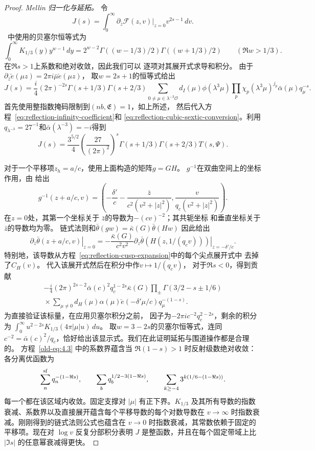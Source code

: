 \documentclass[11pt,a4paper]{article}
\numberwithin{equation}{section}
\numberwithin{figure}{section}
\theoremstyle{definition}
\theoremstyle{remark}
\begin{document}
\begin{proof}
\emph{Mellin 归一化与延拓。}
令
\[
 J(s)=\int_0^\infty
       \left.\partial_{\bar z}\mathcal F(z,v)\right|_{z=0}
       v^{2s-1}\,dv.
\]
~\cite[Lemma~5.3]{DR}中使用的贝塞尔恒等式为
\[
 \int_0^\infty K_{1/3}(y)y^{w-1}\,dy
  =2^{w-2}\Gamma((w-1/3)/2)\Gamma((w+1/3)/2)
       \qquad(\Re w>1/3).
\]
在$\Re s>1$上系数和绝对收敛，因此我们可以
逐项对其展开式求导和积分。
由于$\partial_{\bar z}\check e(\mu z)=2\pi i\bar\mu\check e(\mu z)$，
取$w=2s+1$的恒等式给出
\[
 J(s)=\frac i4(2\pi)^{-2s}\Gamma(s+1/3)\Gamma(s+2/3)
       \sum_{0\ne\mu\in\lambda^{-3}\mathcal O}d_I(\mu)\phi(\lambda^3\mu)
          \prod_p\chi_p(\lambda^3\mu)^{j_p}
          \bar\alpha(\mu)q_\mu^{-s}.
\]
首先使用整指数掩码限制到$(nb,\mathfrak E)=1$，如上所述，
然后代入方程~\eqref{eq:reflection-infinity-coefficient}和
\eqref{eq:reflection-cubic-sextic-conversion}。利用
$q_{\lambda^{-3}}=27^{-1}$和$\bar\alpha(\lambda^{-3})=-i$得到
\begin{equation}\label{eq:reflection-direct-mellin}
 J(s)=\frac{3^{5/2}}4\left(\frac{27}{(2\pi)^2}\right)^s
       \Gamma(s+1/3)\Gamma(s+2/3)T(s,\Psi).
\end{equation}

对于一个平移项$z_h=a/c$，使用上面构造的矩阵$g=GH$。
$g^{-1}$在双曲空间上的坐标作用，由
\cite[Equation (5.1)]{DR}给出
\[
 g^{-1}(z+a/c,v)=
 \left(-\frac{\delta'}c-\frac{\bar z}{c^2(v^2+|z|^2)},
               \frac{v}{q_c(v^2+|z|^2)}\right).
\]
在$z=0$处，其第一个坐标关于
$\bar z$的导数为$-(cv)^{-2}$；其共轭坐标
和垂直坐标关于$\bar z$的导数均为零。
链式法则和$\bar\theta(gw)=\bar\kappa(G)\bar\theta(Hw)$
因此给出
\[
 \left.\partial_{\bar z}\bar\theta(z+a/c,v)\right|_{z=0}
 =-\frac{\bar\kappa(G)}{c^2v^2}
   \left.\partial_z\bar\theta(H(z,1/(q_cv)))\right|_{z=-\delta'/c}.
\]
特别地，该导数从方程~\eqref{eq:reflection-cusp-expansion}中的每个尖点展开式中
去掉了$C_H(v)$。
代入该展开式然后在积分中作$v\mapsto1/(q_cv)$，
对于$\Re s<0$，得到贡献
\begin{equation}\label{eq:reflection-reflected-mellin}
 \begin{split}
 -\frac i4(2\pi)^{2s-2}\bar\alpha(c)^2q_c^{1-2s}\bar\kappa(G)
 \prod_{\pm}\Gamma(3/2-s\pm1/6)\\
 {}
 \times\sum_{\mu\ne0}d_H(\mu)\alpha(\mu)
       \check e(-\delta'\mu/c)q_\mu^{-(1-s)}.
 \end{split}
\end{equation}
为直接验证该标量，在应用贝塞尔积分之前，
因子为$-2\pi i c^{-2}q_c^{2-2s}$，剩余的积分为
$\int_0^\infty u^{2-2s}K_{1/3}(4\pi|\mu|u)\,du$。
取$w=3-2s$的贝塞尔恒等式，连同
$c^{-2}=\bar\alpha(c)^2/q_c$，恰好给出该显示式。我们在此证明延拓与围道操作都是合理的。
方程~\eqref{old-eq:4.3} 中的系数界蕴含当 $\Re(1-s)>1$ 时反射级数绝对收敛：各分离优函数为
\[
 \sum_n^{\rm sf}q_n^{-(1-\Re s)},\qquad
 \sum_b q_b^{1/2-3(1-\Re s)},\qquad
 \sum_{k\ge-4}3^{k(1/6-(1-\Re s))}.
\]
每一个都在该区域内收敛。固定支撑对 $|\mu|$ 有正下界。$K_{1/3}$ 及其所有导数的指数衰减、系数界以及直接展开蕴含每个平移导数的每个对数导数在 $v\to\infty$ 时指数衰减。刚刚得到的链式法则公式也蕴含在 $v\to0$ 时指数衰减，其常数依赖于固定的平移项。现在对 $\log v$ 反复分部积分表明 $J$ 是整函数，并且在每个固定带域上比 $|\Im s|$ 的任意幂衰减得更快。


\end{proof}
\end{document}
